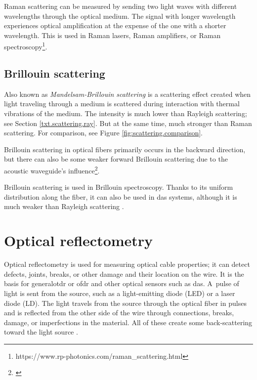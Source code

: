 
Raman scattering can be measured by sending two light waves with different wavelengths through the optical medium. The  signal with longer wavelength experiences optical amplification at the expense of the one with a shorter wavelength. This is used in Raman lasers, Raman amplifiers, or Raman spectroscopy\footnote{https://www.rp-photonics.com/raman\_scattering.html}.


\subsection{Brillouin scattering}\label{txt.scattering.bril}


Also known as \textit{Mandelsam-Brillouin scattering} is a scattering effect created when light traveling through a medium is scattered during interaction with thermal vibrations of the medium. The intensity is much lower than Rayleigh scattering; see Section \ref{txt.scattering.ray}. But at the same time, much stronger than Raman scattering. For comparison, see Figure \ref{fig:scattering.comparison}. 

Brillouin scattering in optical fibers primarily occurs in the backward direction, but there can also be some weaker forward Brillouin scattering due to the acoustic waveguide's influence\footnote{\cite{bhundred}}.

Brillouin scattering is used in Brillouin spectroscopy. Thanks to its uniform distribution along the fiber, it can also be used in \ac{das} systems, although it is much weaker than Rayleigh scattering \cite{dasKislov}.


\section{Optical reflectometry}\label{txt.reflectometry}

Optical reflectometry is used for measuring optical cable properties; it can detect defects, joints, breaks, or other damage and their location on the wire. It is the basis for \ac{generalotdr} or \ac{ofdr} and other optical sensors such as \ac{das}. A~pulse of light is sent from the source, such as a light-emitting diode (LED) or a laser diode (LD). The light travels from the source through the optical fiber in pulses and is reflected from the other side of the wire through connections, breaks, damage, or imperfections in the material. All of these create some back-scattering toward the light source \cite{progress}. 


